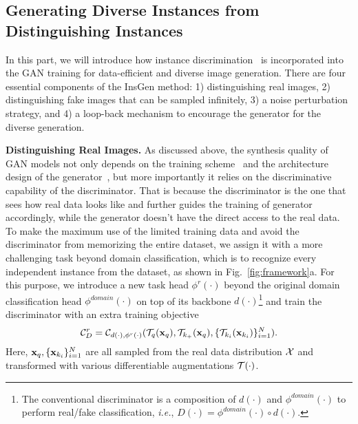 \documentclass{article}
\begin{document}
\subsection{Generating Diverse Instances from Distinguishing Instances}\label{subsec:insgen}


In this part, we will introduce how instance discrimination~\cite{wu2018unsupervised, he2019momentum} is incorporated into the GAN training for data-efficient and diverse image generation. There are four essential components of the InsGen method: 1) distinguishing real images, 2) distinguishing fake images that can be sampled infinitely, 3) a noise perturbation strategy, and 4) a loop-back mechanism to encourage the generator for the diverse generation.


\textbf{Distinguishing Real Images.}
As discussed above, the synthesis quality of GAN models not only depends on the training scheme~\cite{arjovsky2017wasserstein, miyato2018spectral, karras2017progressive, brock2018large} and the architecture design of the generator~\cite{zhang2019self, karras2019style, Karras2019stylegan2}, but more importantly it relies on the discriminative capability of the discriminator.
That is because the discriminator is the one that sees how real data looks like and further guides the training of generator accordingly, while the generator doesn't have the direct access to the real data.
To make the maximum use of the limited training data and avoid the discriminator from memorizing the entire dataset, we assign it with a more challenging task beyond domain classification, which is to recognize every independent instance from the dataset, as shown in Fig.~\ref{fig:framework}a.
For this purpose, we introduce a new task head $\phi^r(\cdot)$ beyond the original domain classification head $\phi^{domain}(\cdot)$ on top of its backbone $d(\cdot)$\footnote{The conventional discriminator is a composition of $d(\cdot)$ and $\phi^{domain}(\cdot)$ to perform real/fake classification, \textit{i.e.}, $D(\cdot) = \phi^{domain}(\cdot) \circ d(\cdot)$.}
and train the discriminator with an extra training objective
\begin{align}
    {\mathcal{C}}^r_D = {\mathcal{C}}_{d(\cdot), \phi^r(\cdot)}({\mathcal{T}}_q({\rm\bf x}_q), {\mathcal{T}}_{k_+}({\rm\bf x}_q), \{{\mathcal{T}}_{k_i}({\rm\bf x}_{k_i})\}_{i=1}^{N}). \label{eqa:real_cl}
\end{align}
Here, ${\rm\bf x}_q, \{{\rm\bf x}_{k_i}\}_{i=1}^{N}$ are all sampled from the real data distribution $\mathcal{X}$ and transformed with various differentiable augmentations ${\mathcal{T}}(\cdot)$.
\end{document}
